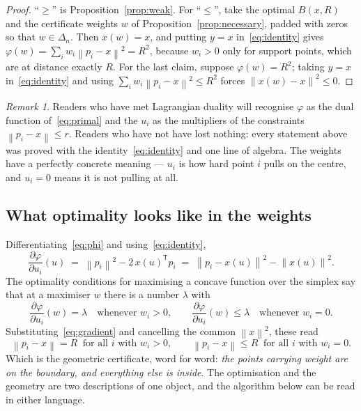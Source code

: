 \documentclass[11pt,a4paper]{article}
\theoremstyle{plain}
\theoremstyle{definition}
\theoremstyle{remark}
\newtheorem*{remark}{Remark}
\newcommand{\norm}[1]{\left\lVert #1 \right\rVert}
\newcommand{\simplex}{\Delta_n}
\newcommand{\transpose}{^{\mathsf{T}}}
\begin{document}
\begin{proof}
  ``$\ge$'' is Proposition~\ref{prop:weak}. For ``$\le$'', take the optimal
  $B(x,R)$ and the certificate weights $w$ of Proposition~\ref{prop:necessary},
  padded with zeros so that $w\in\simplex$. Then $x(w)=x$, and
  putting $y=x$ in~\eqref{eq:identity} gives
  $\varphi(w) = \sum_i w_i\norm{p_i-x}^2 = R^2$, because $w_i>0$ only for support
  points, which are at distance exactly $R$. For the last claim, suppose
  $\varphi(w) = R^2$; taking $y=x$ in~\eqref{eq:identity} and using
  $\sum_i w_i \norm{p_i - x}^2 \le R^2$ forces $\norm{x(w)-x}^2 \le 0$.
\end{proof}

\begin{remark}
  Readers who have met Lagrangian duality will recognise $\varphi$ as the dual
  function of~\eqref{eq:primal} and the $u_i$ as the multipliers of the
  constraints $\norm{p_i-x}\le r$. Readers who have not have lost nothing: every
  statement above was proved with the identity~\eqref{eq:identity} and one line of
  algebra. The weights have a perfectly concrete meaning --- $u_i$ is how hard
  point $i$ pulls on the centre, and $u_i=0$ means it is not pulling at all.
\end{remark}

\subsection{What optimality looks like in the weights}

Differentiating~\eqref{eq:phi} and using~\eqref{eq:identity},
\begin{equation}
  \label{eq:gradient}
  \frac{\partial \varphi}{\partial u_i}(u)
    \;=\; \norm{p_i}^2 - 2\, x(u)\transpose p_i
    \;=\; \norm{p_i - x(u)}^2 - \norm{x(u)}^2 .
\end{equation}
The optimality conditions for maximising a concave function over the simplex say
that at a maximiser $w$ there is a number $\lambda$ with
\[
  \frac{\partial \varphi}{\partial u_i}(w) = \lambda \quad\text{whenever } w_i>0,
  \qquad
  \frac{\partial \varphi}{\partial u_i}(w) \le \lambda \quad\text{whenever } w_i=0 .
\]
Substituting~\eqref{eq:gradient} and cancelling the common $\norm{x}^2$, these read
\begin{equation}
  \label{eq:kkt}
  \norm{p_i - x} = R \ \text{ for all } i \text{ with } w_i>0,
  \qquad
  \norm{p_i - x} \le R \ \text{ for all } i \text{ with } w_i = 0 .
\end{equation}
Which is the geometric certificate, word for word: \emph{the points carrying
weight are on the boundary, and everything else is inside}. The optimisation and
the geometry are two descriptions of one object, and the algorithm below can be
read in either language.
\end{document}
